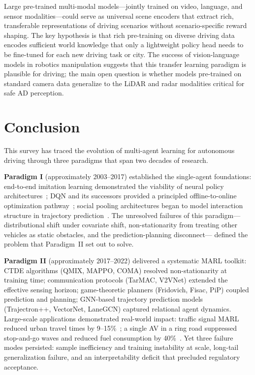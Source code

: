 \documentclass[12pt, a4paper]{article}
\begin{document}
Large pre-trained multi-modal models---jointly trained on video, language,
and sensor modalities---could serve as universal scene encoders that
extract rich, transferable representations of driving scenarios without
scenario-specific reward shaping.  The key hypothesis is that rich
pre-training on diverse driving data encodes sufficient world knowledge
that only a lightweight policy head needs to be fine-tuned for each new
driving task or city.  The success of vision-language models in robotics
manipulation suggests that this transfer learning paradigm is plausible
for driving; the main open question is whether models pre-trained on
standard camera data generalize to the LiDAR and radar modalities critical
for safe AD perception.

\section{Conclusion}
\label{sec:conclusion}

This survey has traced the evolution of multi-agent learning for autonomous
driving through three paradigms that span two decades of research.

\textbf{Paradigm I} (approximately 2003--2017) established the single-agent
foundations: end-to-end imitation learning demonstrated the viability of
neural policy architectures~\cite{bojarski2016end}; DQN and its successors
provided a principled offline-to-online optimization pathway~\cite{mnih2015human};
social pooling architectures began to model interaction structure in trajectory
prediction~\cite{alahi2016social}.  The unresolved failures of this paradigm---
distributional shift under covariate shift, non-stationarity from treating
other vehicles as static obstacles, and the prediction-planning disconnect---
defined the problem that Paradigm~II set out to solve.

\textbf{Paradigm II} (approximately 2017--2022) delivered a systematic
MARL toolkit: CTDE algorithms (QMIX, MAPPO, COMA) resolved non-stationarity
at training time; communication protocols (TarMAC, V2VNet) extended the
effective sensing horizon; game-theoretic planners (Fridovich, Fisac, PiP)
coupled prediction and planning; GNN-based trajectory prediction models
(Trajectron++, VectorNet, LaneGCN) captured relational agent dynamics.
Large-scale applications demonstrated real-world impact: traffic signal MARL
reduced urban travel times by 9--15\%~\cite{wei2019colight}; a single AV
in a ring road suppressed stop-and-go waves and reduced fuel consumption
by 40\%~\cite{stern2018dissipation}.  Yet three failure modes persisted:
sample inefficiency and training instability at scale, long-tail generalization
failure, and an interpretability deficit that precluded regulatory acceptance.
\end{document}
